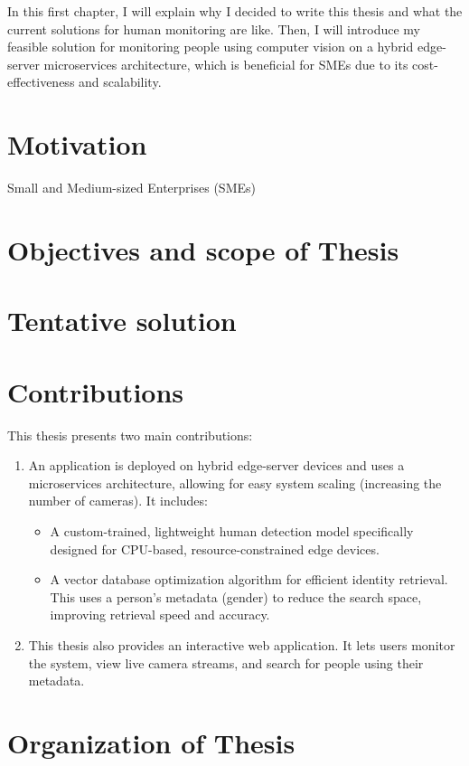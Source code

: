 \documentclass[../main.tex]{subfiles}
\begin{document}
In this first chapter, I will explain why I decided to write this thesis and what the current solutions for human monitoring are like. Then, I will introduce my feasible solution for monitoring people using computer vision on a hybrid edge-server microservices architecture, which is beneficial for SMEs due to its cost-effectiveness and scalability.


\section{Motivation}
\label{sec:motivation}

Small and Medium-sized Enterprises (SMEs) 

\section{Objectives and scope of Thesis} 
\label{sec:objectives}

\section{Tentative solution}
\label{sec:solution}

\section{Contributions}
\label{sec:contribution}

This thesis presents two main contributions:
\begin{enumerate}
    \item An application is deployed on hybrid edge-server devices and uses a microservices architecture, allowing for easy system scaling (increasing the number of cameras). It includes:
    \begin{itemize}
        \item A custom-trained, lightweight human detection model specifically designed for CPU-based, resource-constrained edge devices.
        \item A vector database optimization algorithm for efficient identity retrieval. This uses a person's metadata (gender) to reduce the search space, improving retrieval speed and accuracy.
    \end{itemize} 
    \item This thesis also provides an interactive web application. It lets users monitor the system, view live camera streams, and search for people using their metadata.
\end{enumerate}

\section{Organization of Thesis}
\label{sec:organize}
\end{document}
